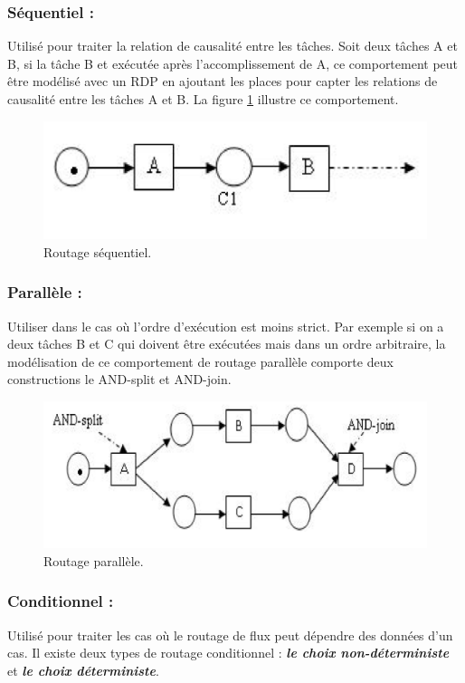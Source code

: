 \subsubsection{Séquentiel :}

Utilisé pour traiter la relation de causalité entre les tâches. Soit deux tâches A et B, si la tâche B et exécutée après l’accomplissement de A, ce comportement peut être modélisé avec un RDP en ajoutant les places pour capter les relations de causalité entre les tâches A et B. La figure \ref{fig:wf003} illustre ce comportement.


\begin{figure}[H]
	\centering
	\includegraphics[width=0.7\linewidth]{images/wf003}
	\caption{Routage séquentiel.}
	\label{fig:wf003}
\end{figure}

\subsubsection{Parallèle : }
Utiliser dans le cas où l’ordre d’exécution est moins strict. Par exemple si on a deux tâches B et C qui doivent être exécutées mais dans un ordre arbitraire, la modélisation de ce comportement de routage parallèle comporte deux constructions le AND-split et AND-join.


\begin{figure}[H]
	\centering
	\includegraphics[width=0.7\linewidth]{images/Capture}
	\caption{Routage parallèle.}
	\label{fig:capture}
\end{figure}

\subsubsection{Conditionnel :}

Utilisé pour traiter les cas où le routage de flux peut dépendre des données d’un cas. Il existe deux types de routage conditionnel : \textit{\textbf{le choix non-déterministe}} et \textit{\textbf{le choix déterministe}}. 


